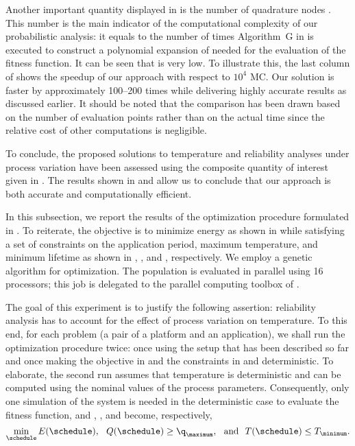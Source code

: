 Another important quantity displayed in  is the number of quadrature
nodes \nq. This number is the main indicator of the computational complexity of
our probabilistic analysis: it equals to the number of times Algorithm~G in
 is executed to construct a polynomial expansion of
 needed for the evaluation of the fitness function.
It can be seen that \nq is very low. To illustrate this, the last column of
 shows the speedup of our approach with respect to $10^4$ \ac{MC}.
Our solution is faster by approximately 100--200 times while delivering highly
accurate results as discussed earlier. It should be noted that the comparison
has been drawn based on the number of evaluation points rather than on the
actual time since the relative cost of other computations is negligible.

To conclude, the proposed solutions to temperature and reliability analyses
under process variation have been assessed using the composite quantity of
interest given in . The results shown in
 and  allow us to conclude that our approach is both
accurate and computationally efficient.


In this subsection, we report the results of the optimization procedure
formulated in . To reiterate, the objective is to
minimize energy as shown in  while satisfying a set of
constraints on the application period, maximum temperature, and minimum lifetime
as shown in , , and
, respectively. We employ a genetic algorithm for
optimization. The population is evaluated in parallel using 16 processors; this
job is delegated to the parallel computing toolbox of  \cite{matlab}.

The goal of this experiment is to justify the following assertion: reliability
analysis has to account for the effect of process variation on temperature. To
this end, for each problem (a pair of a platform and an application), we shall
run the optimization procedure twice: once using the setup that has been
described so far and once making the objective in  and the
constraints in  and 
deterministic. To elaborate, the second run assumes that temperature is
deterministic and can be computed using the nominal values of the process
parameters. Consequently, only one simulation of the system is needed in the
deterministic case to evaluate the fitness function, and ,
, and  become,
respectively,
\[
  \min_{\schedule} E(\schedule), \hspace{0.7em}
  Q(\schedule) \geq \q_\maximum, \hspace{0.7em} \text{and} \hspace{0.7em}
  T(\schedule) \leq T_\minimum.
\]

